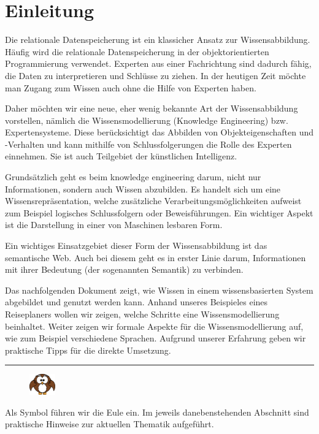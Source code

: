 \chapter{Einleitung}
\label{chap:einleitung}
Die relationale Datenspeicherung ist ein klassicher Ansatz zur Wissensabbildung. Häufig wird die relationale Datenspeicherung in der objektorientierten Programmierung verwendet. Experten aus einer Fachrichtung sind dadurch fähig, die Daten zu interpretieren und Schlüsse zu ziehen. In der heutigen Zeit möchte man Zugang zum Wissen auch ohne die Hilfe von Experten haben. 

Daher möchten wir eine neue, eher wenig bekannte Art der Wissensabbildung vorstellen, nämlich die Wissensmodellierung (Knowledge Engineering) bzw. Expertensysteme. Diese berücksichtigt das Abbilden von Objekteigenschaften und -Verhalten und kann mithilfe von Schlussfolgerungen die Rolle des Experten einnehmen. Sie ist auch Teilgebiet der künstlichen Intelligenz.

Grundsätzlich geht es beim knowledge engineering darum, nicht nur Informationen, sondern auch Wissen abzubilden. Es handelt sich um eine Wissensrepräsentation, welche zusätzliche Verarbeitungsmöglichkeiten aufweist zum Beispiel logisches Schlussfolgern oder Beweisführungen. Ein wichtiger Aspekt ist die Darstellung in einer von Maschinen lesbaren Form.~\cite{ISpekOntoGeschichte}

Ein wichtiges Einsatzgebiet dieser Form der Wissensabbildung ist das semantische Web. Auch bei diesem geht es in erster Linie darum, Informationen mit ihrer Bedeutung (der sogenannten Semantik) zu verbinden.

Das nachfolgenden Dokument zeigt, wie Wissen in einem wissensbasierten System abgebildet und genutzt werden kann. Anhand unseres Beispieles eines Reiseplaners wollen wir zeigen, welche Schritte eine Wissensmodellierung beinhaltet. Weiter zeigen wir formale Aspekte für die Wissensmodellierung auf, wie zum Beispiel verschiedene Sprachen. Aufgrund unserer Erfahrung geben wir praktische Tipps für die direkte Umsetzung.

\noindent\rule[1ex]{\textwidth}{1pt}
\begin{figure}
    \vspace{-12pt}
    \includegraphics[width=0.1\textwidth]{bilder/owl.png}\protect\footnotemark{}
\end{figure}
Als Symbol führen wir die Eule ein. Im jeweils danebenstehenden Abschnitt sind praktische Hinweise zur aktuellen Thematik aufgeführt.

